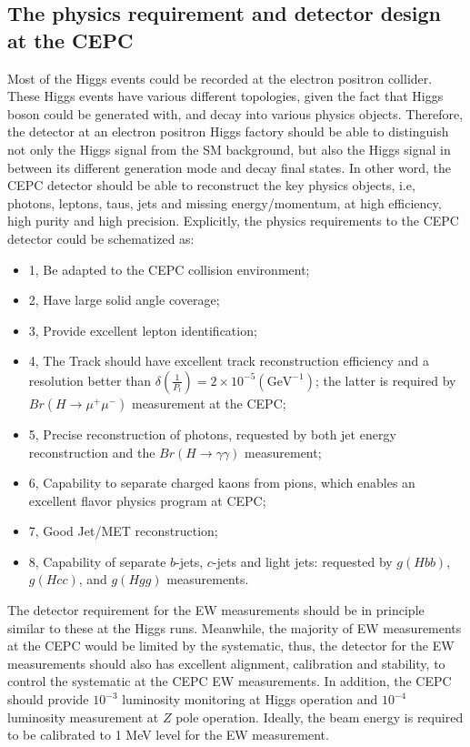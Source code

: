 \subsection { The physics requirement and detector design at the CEPC }

Most of the Higgs events could be recorded at the electron positron collider.
These Higgs events have various different topologies, given the fact that Higgs boson could be generated with,
and decay into various physics objects.
Therefore, the detector at an electron positron Higgs factory should be able to distinguish
not only the Higgs signal from the SM background,
but also the Higgs signal in between its different generation mode and decay final states.
In other word, the CEPC detector should be able to reconstruct the key physics objects,
i.e, photons, leptons, taus, jets and missing energy/momentum, at high efficiency,
high purity and high precision. Explicitly, the physics requirements to the CEPC detector could be schematized as: 

\begin{itemize}
\item []1, Be adapted to the CEPC collision environment;
\item []2, Have large solid angle coverage;
\item []3, Provide excellent lepton identification;
\item []4, The Track should have excellent track reconstruction efficiency and
  a resolution better than $\delta(\frac{1}{P_t}) = 2\times 10^{-5}(\mbox{GeV}^{-1})$;
  the latter is required by $Br(H \to\mu^+\mu^-)$ measurement at the CEPC;
\item []5, Precise reconstruction of photons, requested by both jet energy reconstruction and the $Br(H\to \gamma\gamma)$ measurement;
\item []6, Capability to separate charged kaons from pions, which enables an excellent flavor physics program at CEPC;
\item []7, Good Jet/MET reconstruction;
\item []8, Capability of separate $b$-jets, $c$-jets and light jets: requested by $g(Hbb)$, $g(Hcc)$, and $g(Hgg)$ measurements.
\end{itemize}

The detector requirement for the EW measurements should be in principle similar to these at the Higgs runs.
Meanwhile, the majority of EW measurements at the CEPC would be limited by the systematic, thus,
the detector for the EW measurements should also has excellent alignment, calibration and stability,
to control the systematic at the CEPC EW measurements.
In addition,
the CEPC should provide $10^{-3}$ luminosity monitoring at Higgs operation and $10^{-4}$ luminosity measurement at $Z$ pole operation.
Ideally, the beam energy is required to be calibrated to 1 MeV level for the EW measurement. 

